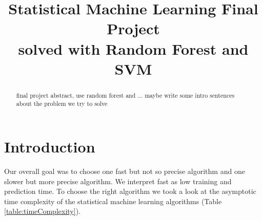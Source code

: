 \documentclass[conference]{IEEEtran}
\begin{document}
\title{Statistical Machine Learning Final Project\\
    {\large solved with Random Forest and SVM}
}

\author{
\and
{}
\and
{}
}

\maketitle

\begin{abstract}
final project abstract, use random forest and ...
maybe write some intro sentences about the problem we try to solve
\end{abstract}

\section{Introduction}
\textcolor{til}{
    Our overall goal was to choose one fast but not so precise algorithm and one slower but more precise algorithm. We interpret fast as low training and prediction time. To choose the right algorithm we took a look at the asymptotic time complexity of the statistical machine learning algorithms (Table \ref{table:timeComplexity}).}
\end{document}

